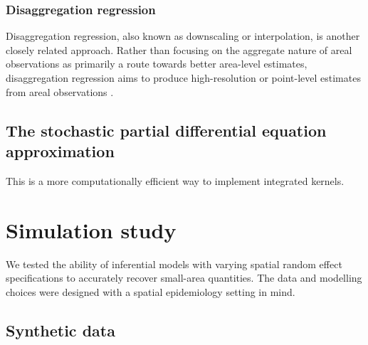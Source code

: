 \documentclass[a4paper, nobind]{templates/ociamthesis}
\begin{document}
\hypertarget{disaggregation-regression}{%
\subsubsection{Disaggregation regression}\label{disaggregation-regression}}

Disaggregation regression, also known as downscaling or interpolation, is another closely related approach.
Rather than focusing on the aggregate nature of areal observations as primarily a route towards better area-level estimates, disaggregation regression aims to produce high-resolution or point-level estimates from areal observations \autocite{utazi2019spatial,nandi2023disaggregation}.

\hypertarget{the-stochastic-partial-differential-equation-approximation}{%
\subsection{The stochastic partial differential equation approximation}\label{the-stochastic-partial-differential-equation-approximation}}

This is a more computationally efficient way to implement integrated kernels.

\hypertarget{simulation-study}{%
\section{Simulation study}\label{simulation-study}}

We tested the ability of inferential models with varying spatial random effect specifications to accurately recover small-area quantities.
The data and modelling choices were designed with a spatial epidemiology setting in mind.

\hypertarget{synthetic-data}{%
\subsection{Synthetic data}\label{synthetic-data}}
\end{document}
